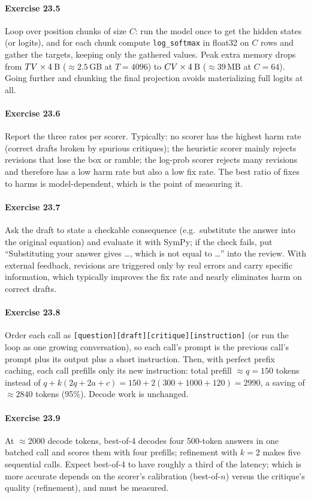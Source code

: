 \paragraph{Exercise 23.5} Loop over position chunks of size $C$: run the model once to get the hidden
states (or logits), and for each chunk compute \texttt{log\_softmax} in float32 on $C$ rows and gather
the targets, keeping only the gathered values. Peak extra memory drops from $TV \times 4$\,B
($\approx 2.5$\,GB at $T = 4096$) to $CV\times 4$\,B ($\approx 39$\,MB at $C = 64$). Going
further and chunking the final projection avoids materializing full logits at all.

\paragraph{Exercise 23.6} Report the three rates per scorer. Typically: no scorer has the highest
harm rate (correct drafts broken by spurious critiques); the heuristic scorer mainly rejects
revisions that lose the box or ramble; the log-prob scorer rejects many revisions and therefore has
a low harm rate but also a low fix rate. The best ratio of fixes to harms is model-dependent, which
is the point of measuring it.

\paragraph{Exercise 23.7} Ask the draft to state a checkable consequence (e.g.\ substitute the answer
into the original equation) and evaluate it with SymPy; if the check fails, put ``Substituting your
answer gives \dots, which is not equal to \dots'' into the review. With external feedback, revisions
are triggered only by real errors and carry specific information, which typically improves the fix
rate and nearly eliminates harm on correct drafts.

\paragraph{Exercise 23.8} Order each call as \texttt{[question][draft][critique][instruction]}
(or run the loop as one growing conversation), so each call's prompt is the previous call's prompt
plus its output plus a short instruction. Then, with perfect prefix caching, each call prefills only
its new instruction: total prefill $\approx q = 150$ tokens instead of $q + k(2q + 2a + c) = 150 +
2(300 + 1000 + 120) = 2990$, a saving of $\approx 2840$ tokens (95\%). Decode work is unchanged.

\paragraph{Exercise 23.9} At $\approx$2000 decode tokens, best-of-4 decodes four 500-token answers in
one batched call and scores them with four prefills; refinement with $k = 2$ makes five sequential
calls. Expect best-of-4 to have roughly a third of the latency; which is more accurate depends on the
scorer's calibration (best-of-$n$) versus the critique's quality (refinement), and must be measured.
